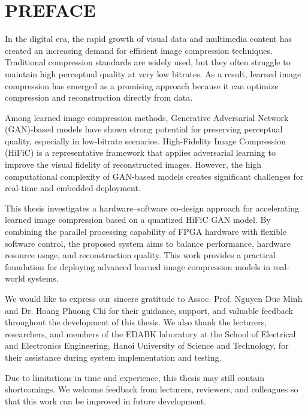 \section*{PREFACE}
\thispagestyle{empty}

In the digital era, the rapid growth of visual data and multimedia content has created an increasing demand for efficient image compression techniques. Traditional compression standards are widely used, but they often struggle to maintain high perceptual quality at very low bitrates. As a result, learned image compression has emerged as a promising approach because it can optimize compression and reconstruction directly from data.

Among learned image compression methods, Generative Adversarial Network (GAN)-based models have shown strong potential for preserving perceptual quality, especially in low-bitrate scenarios. High-Fidelity Image Compression (HiFiC) is a representative framework that applies adversarial learning to improve the visual fidelity of reconstructed images. However, the high computational complexity of GAN-based models creates significant challenges for real-time and embedded deployment.

This thesis investigates a hardware--software co-design approach for accelerating learned image compression based on a quantized HiFiC GAN model. By combining the parallel processing capability of FPGA hardware with flexible software control, the proposed system aims to balance performance, hardware resource usage, and reconstruction quality. This work provides a practical foundation for deploying advanced learned image compression models in real-world systems.

We would like to express our sincere gratitude to Assoc. Prof. Nguyen Duc Minh and Dr. Hoang Phuong Chi for their guidance, support, and valuable feedback throughout the development of this thesis. We also thank the lecturers, researchers, and members of the EDABK laboratory at the School of Electrical and Electronics Engineering, Hanoi University of Science and Technology, for their assistance during system implementation and testing.

Due to limitations in time and experience, this thesis may still contain shortcomings. We welcome feedback from lecturers, reviewers, and colleagues so that this work can be improved in future development.

\cleardoublepage